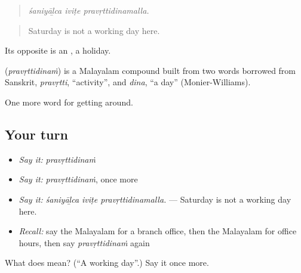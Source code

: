 \begin{quote}
\emph{śaniyāḻca iviṭe pravṛttidinamalla.}
\end{quote}

\begin{quote}
Saturday is not a working day here.
\end{quote}

Its opposite is an , a holiday.

\begin{cousinweb}
\textbf{} (\emph{pravṛttidinaṁ}) is a Malayalam compound built from two words borrowed from Sanskrit, \emph{pravṛtti}, \textquotedblleft{}activity\textquotedblright{}, and \emph{dina}, \textquotedblleft{}a day\textquotedblright{} (Monier-Williams).
\end{cousinweb}

\begin{grammarlens}[title={What you've built}]
One more word for getting around.
\end{grammarlens}

\subsection*{Your turn}
\begin{itemize}
\raggedright
  \item \emph{Say it:} \emph{pravṛttidinaṁ}
  \item \emph{Say it:} \emph{pravṛttidinaṁ}, once more
  \item \emph{Say it:} \emph{śaniyāḻca iviṭe pravṛttidinamalla.} — Saturday is not a working day here.
  \item \emph{Recall:} say the Malayalam for a branch office, then the Malayalam for office hours, then say \emph{pravṛttidinaṁ} again
\end{itemize}

\begin{tcolorbox}[breakable,colback=teal!4,colframe=teal!35!black,title={Before you move on}]
What does  mean? (\textquotedblleft{}A working day\textquotedblright{}.) Say it once more.
\end{tcolorbox}
